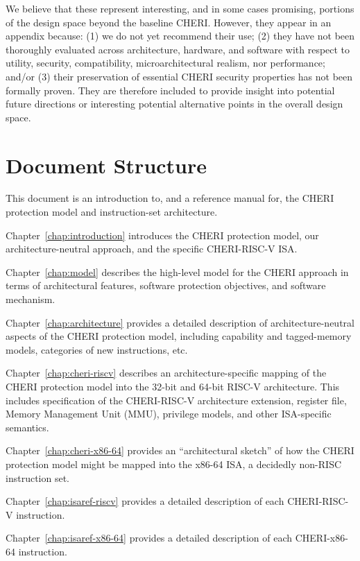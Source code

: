 We believe that these represent interesting, and in some cases promising,
portions of the design space beyond the baseline CHERI.
However, they appear in an appendix because: (1) we do not yet recommend their
use; (2) they have not been thoroughly evaluated across architecture,
hardware, and software with respect to utility, security, compatibility,
microarchitectural realism, nor performance; and/or (3) their preservation of
essential CHERI security properties has not been formally proven.
They are therefore included to provide insight into potential future
directions or interesting potential alternative points in the overall design
space.

\section{Document Structure}

This document is an introduction to, and a reference manual for, the CHERI
protection model and instruction-set architecture.

\medskip
\noindent
Chapter~\ref{chap:introduction} introduces the CHERI protection model, our
architecture-neutral approach, and the specific CHERI-RISC-V ISA.

\medskip
\noindent
Chapter~\ref{chap:model} describes the high-level model for the CHERI approach
in terms of architectural features, software protection objectives, and
software mechanism.

\medskip
\noindent
Chapter~\ref{chap:architecture} provides a detailed description of
architecture-neutral aspects of the CHERI protection model, including
capability and tagged-memory models, categories of new instructions, etc.

\medskip
\noindent
Chapter~\ref{chap:cheri-riscv} describes an architecture-specific mapping
of the CHERI protection model into the 32-bit and 64-bit RISC-V architecture.
This includes specification of the CHERI-RISC-V architecture extension,
register file, Memory Management Unit (MMU), privilege models, and other
ISA-specific semantics.

\medskip
\noindent
Chapter~\ref{chap:cheri-x86-64} provides an ``architectural sketch'' of how
the CHERI protection model might be mapped into the x86-64 ISA, a decidedly
non-RISC instruction set.

\medskip
\noindent
Chapter~\ref{chap:isaref-riscv} provides a detailed description of each
CHERI-RISC-V instruction.

\medskip
\noindent
Chapter~\ref{chap:isaref-x86-64} provides a detailed description of each
CHERI-x86-64 instruction.

